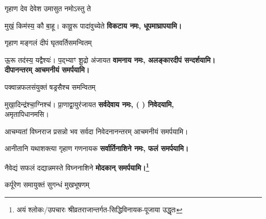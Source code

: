 \begin{center}
\needspace{3em}
\begingroup
\setlength{\columnseprule}{1pt}
\let\chapt\sect


\endgroup

{गृहाण देव देवेश उमासुत नमोऽस्तु ते}

{मुखं॒ किम॑स्य॒ कौ बा॒हू। कावू॒रू पादा॑वुच्येते}
\textbf{विकटाय नमः, धूपमाघ्रापयामि।}
\medskip

{गृहाण मङ्गलं दीपं घृतवर्तिसमन्वितम्}

{ऊ॒रू तद॑स्य॒ यद्वैश्यः॑। प॒द्भ्याꣳ शू॒द्रो अ॑जायत}
\textbf{वामनाय नमः, अलङ्कारदीपं सन्दर्शयामि।\\
दीपानन्तरम् आचमनीयं समर्पयामि।}
\medskip


{पक्वान्नफलसंयुक्तं षड्रसैश्च समन्वितम्}

{मुखा॒दिन्द्र॑श्चा॒ग्निश्च॑। प्रा॒णाद्वा॒युर॑जायत}
\textbf{सर्वदेवाय नमः, (	) निवेदयामि,\\}
अमृतापिधानमसि।

{आचम्यतां विघ्नराज प्रसन्नो भव सर्वदा}
निवेदनानन्तरम् आचमनीयं समर्पयामि।\medskip




{आनीतानि यथाशक्त्या गृहाण गणनायक}
\textbf{सर्वार्तिनाशिने नमः, फलं समर्पयामि।}
\medskip

{नैवेद्यं सफलं दद्यान्नमस्ते विघ्ननाशिने}
\textbf{\devAya{} मोदकान् समर्पयामि।\footnote{अयं श्लोकः/उपचारः श्रीव्रतराजान्तर्गत-सिद्धिविनायक-पूजाया उद्धृतः}
}
\medskip

{कर्पूरेण समायुक्तं सुगन्धं मुखभूषणम्}


\end{center}
